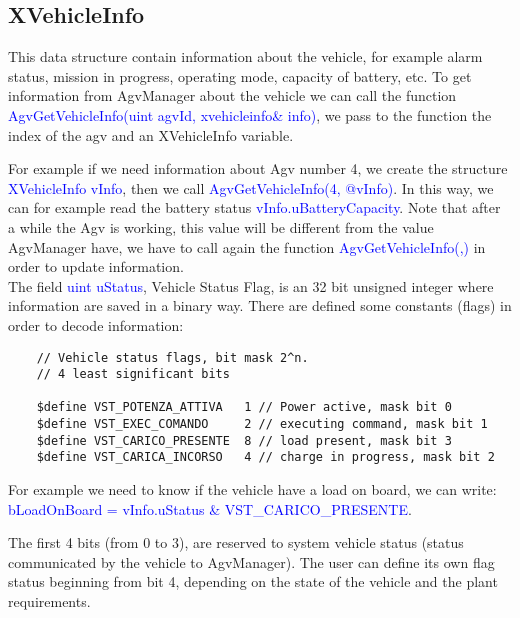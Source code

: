 \subsection{XVehicleInfo}
This data structure contain information about the vehicle, for example alarm status, mission in progress, operating mode, capacity of battery, etc.
To get information from AgvManager about the vehicle we can call the function \textcolor{blue}{AgvGetVehicleInfo(uint agvId, xvehicleinfo\& info)}, we pass to the function the index of the agv and an XVehicleInfo variable.

For example if we need information about Agv number 4, we create the structure \textcolor{blue}{XVehicleInfo vInfo}, then we call \textcolor{blue}{AgvGetVehicleInfo(4, @vInfo)}.
In this way, we can for example read the battery status \textcolor{blue}{vInfo.uBatteryCapacity}. Note that after a while the Agv is working, this value will be different from the value AgvManager have, we have to call again the function \textcolor{blue}{AgvGetVehicleInfo(,)} in order to update information.\\

The field \textcolor{blue}{uint uStatus}, Vehicle Status Flag,  is an 32 bit unsigned integer where information are saved in a binary way. There are defined some constants (flags) in order to decode information:
\begin{lstlisting}
	// Vehicle status flags, bit mask 2^n.
	// 4 least significant bits
	
	$define VST_POTENZA_ATTIVA   1 // Power active, mask bit 0
	$define VST_EXEC_COMANDO     2 // executing command, mask bit 1
	$define VST_CARICO_PRESENTE  8 // load present, mask bit 3
	$define VST_CARICA_INCORSO   4 // charge in progress, mask bit 2
\end{lstlisting}

For example we need to know if the vehicle have a load on board, we can write:
\textcolor{blue}{bLoadOnBoard = vInfo.uStatus  \&  VST\_CARICO\_PRESENTE}.

The first 4 bits (from 0 to 3), are reserved to system vehicle status (status communicated by the vehicle to AgvManager).
The user can define its own flag status beginning from bit 4, depending on the state of the vehicle and the plant requirements.\\

